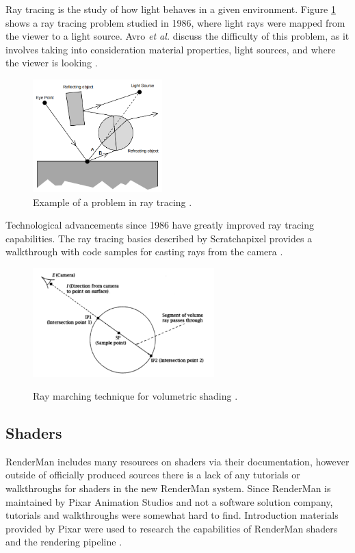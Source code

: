 \documentclass[conference]{IEEEtran}
\begin{document}
Ray tracing is the study of how light behaves in a given environment.
Figure \ref{fig:raytrace}
shows a ray tracing problem studied in 1986, where light rays were mapped from
the viewer to a light source. Avro \textit{et al.}
discuss the difficulty of this problem,
as it involves taking into consideration material properties, light sources,
and where the viewer is looking \cite{backwards_raytrace}.

\begin{figure}[htbp]
\centerline{\includegraphics[width=5cm]{raytrace.png}}
\caption{Example of a problem in ray tracing \cite{backwards_raytrace}.}
\label{fig:raytrace}
\end{figure}

Technological advancements since 1986 have greatly improved ray tracing capabilities.
The ray tracing basics described by Scratchapixel 
provides a walkthrough with code samples for casting rays from the camera
\cite{raytrace_walkthrough}.

\begin{figure}[htbp]
\centering
{\includegraphics[width=7cm]{ray_marching.png}}
\caption{Ray marching technique for volumetric shading \cite{ray_marching}.}
\label{fig:ray_marching}
\end{figure}

\subsection{Shaders}
RenderMan includes many resources on shaders via their documentation,
however outside of officially produced sources there is a lack of any tutorials or
walkthroughs for shaders in the new RenderMan system.
Since RenderMan is maintained by Pixar Animation Studios and not a software solution
company, tutorials and walkthroughs were somewhat hard to find.
Introduction materials provided by Pixar were used to research the capabilities
of RenderMan shaders and the rendering pipeline \cite{renderman}.
\end{document}
